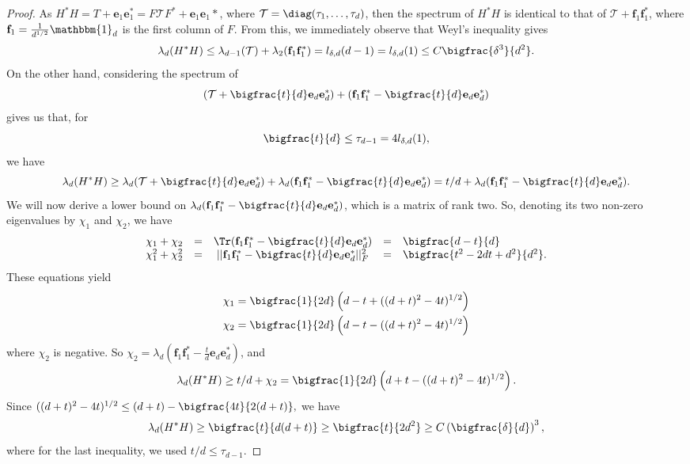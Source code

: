 \begin{proof}
As $H^* H = T + \mathbf{e}_1 \mathbf{e}_1^* = F \mathcal{T} F^* + \mathbf{e}_1 \mathbf{e}_1*$, where $\mathcal{T} = \diag(\tau_1, \ldots, \tau_d)$, then the spectrum of $H^* H$ is identical to that of $\mathcal{T} + \mathbf{f}_1 \mathbf{f}_1^*$, where $\mathbf{f}_1 = \frac{1}{d^{1/2}}\mathbbm{1}_d$ is the first column of $F$.  From this, we immediately observe that Weyl's inequality gives
%
\[\lambda_d(H^* H) \le \lambda_{d-1}(\mathcal{T}) + \lambda_2(\mathbf{f}_1 \mathbf{f}_1^*) = l_{\delta, d}(d-1) = l_{\delta, d}(1) \leq C\bigfrac{\delta^3}{d^2}.\]
%
On the other hand, considering the spectrum of \[(\mathcal{T} + \bigfrac{t}{d} \mathbf{e}_d \mathbf{e}_d^*) + (\mathbf{f}_1 \mathbf{f}_1^* - \bigfrac{t}{d} \mathbf{e}_d \mathbf{e}_d^*)\] gives us that, for $$\bigfrac{t}{d} \le \tau_{d-1} = 4l_{\delta, d}(1),$$ we have \[\lambda_d(H^* H) \ge \lambda_d(\mathcal{T} + \bigfrac{t}{d} \mathbf{e}_d \mathbf{e}_d^*) + \lambda_d(\mathbf{f}_1 \mathbf{f}_1^* - \bigfrac{t}{d} \mathbf{e}_d \mathbf{e}_d^*) = t/d + \lambda_d(\mathbf{f}_1 \mathbf{f}_1^* - \bigfrac{t}{d} \mathbf{e}_d \mathbf{e}_d^*).\]
%
We will now derive a lower bound on $\lambda_d(\mathbf{f}_1 \mathbf{f}_1^* - \bigfrac{t}{d} \mathbf{e}_d \mathbf{e}_d^*)$, which is a matrix of rank two. So, denoting its two non-zero eigenvalues by $\chi_1$ and $\chi_2$, we have
\[\begin{array}{rcccl}
\chi_1 + \chi_2 & = & \Tr(\mathbf{f}_1 \mathbf{f}_1^* - \bigfrac{t}{d} \mathbf{e}_d \mathbf{e}_d^*) & = & \bigfrac{d - t}{d} \\
\chi_1^2 + \chi_2^2 & = & ||\mathbf{f}_1 \mathbf{f}_1^* - \bigfrac{t}{d} \mathbf{e}_d \mathbf{e}_d^*||_F^2 & = & \bigfrac{t^2 - 2dt + d^2}{d^2}. \\
\end{array}\]
These equations yield
\begin{align}
\chi_1 %
 & =  \bigfrac{1}{2d}\left(d - t + ((d + t)^2 - 4t)^{1/2}\right) \nonumber\\
\chi_2 & =  \bigfrac{1}{2d}\left(d - t - ((d + t)^2 - 4t)^{1/2}\right)\nonumber
\end{align}
where $\chi_2$ is negative. So $\chi_2 = \lambda_d(\mathbf{f}_1\mathbf{f}_1^*-\frac{t}{d}\mathbf{e}_d\mathbf{e}_d^*)$, and
\[\lambda_d(H^* H) \ge t/d + \chi_2 = \bigfrac{1}{2d}\left(d + t - ((d + t)^2 - 4t)^{1/2}\right).\]
Since $((d + t)^2 - 4t)^{1/2} \le (d + t) - \bigfrac{4t}{2(d + t)},$  we have
\[\lambda_d(H^* H) \ge \bigfrac{t}{d(d + t)} \ge \bigfrac{t}{2d^2} \geq C \left(\bigfrac{\delta}{d}\right)^3,\]
where for the last inequality, we used $t/d \leq \tau_{d-1}.$ 

\end{proof}


